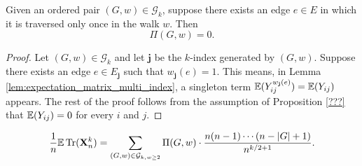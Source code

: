 \begin{lemma}[$\Pi (G,w) = 0$ : R-1-15 : lem:Pi.prod\_eq\_zero\_if\_w\_le\_two]
  \label{lem:Pi.prod_eq_zero_if_w_le_two}
  Given an ordered pair $(G,w) \in \mathcal{G}_k$, suppose there exists an edge $e \in E$ in which it is traversed only once in the walk $w$. Then
  \[
  \Pi (G,w) = 0.
  \]
\end{lemma}
\begin{proof}
  Let $(G,w) \in \mathcal{G}_k$ and let $\mathbf{j}$ be the $k$-index generated by $(G,w)$. Suppose there exists an edge $e \in E_\mathbf{j}$ such that $w_\mathbf{j}(e) = 1$.
  This means, in Lemma \ref{lem:expectation_matrix_multi_index}, a singleton term $\mathbb{E} (Y_{ij}^{w_\mathbf{j}(e)}) = \mathbb{E} (Y_{ij})$ appears.
  The rest of the proof follows from the assumption of Proposition \ref{???} that $\mathbb{E} (Y_{ij}) = 0$ for every $i$ and $j$. 
\end{proof}
\begin{lemma}[Simplifying the summation with the fact $\Pi (G,w) = 0$ in certain cases: R-1-16 : lem:equation\_4.8]
  \label{lem:equation_4.8}
  \[
  \frac{1}{n} \mathbb{E} \operatorname{Tr} (\mathbf{X}_n^k) 
  = \sum_{(G,w) \in \mathcal{G}_{k, w \geq 2}} \Pi (G,w) \cdot \frac{n (n-1) \cdots (n - |G| + 1)}{n^{k/2+1}}.
  \]

\end{lemma}
